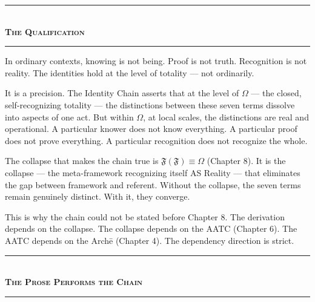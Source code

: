 \documentclass[10pt, openany, oneside]{book}
\renewcommand{\normalsize}{\fontsize{10}{13}\selectfont}
\begin{document}
\vspace{1.5em}


\begin{center}
    \rule{0.3\textwidth}{0.4pt}\\[0.5em]
    {\normalsize\bfseries\scshape The Qualification}\\[0.3em]
    \rule{0.3\textwidth}{0.4pt}
\end{center}

\vspace{1em}

\noindent In ordinary contexts, knowing is not being. Proof is not truth. Recognition is not reality. The identities hold at the level of totality --- not ordinarily.

It is a precision. The Identity Chain asserts that at the level of $\Omega$ --- the closed, self-recognizing totality --- the distinctions between these seven terms dissolve into aspects of one act. But within $\Omega$, at local scales, the distinctions are real and operational. A particular knower does not know everything. A particular proof does not prove everything. A particular recognition does not recognize the whole.

The collapse that makes the chain true is $\mathfrak{F}(\mathfrak{F}) \equiv \Omega$ (Chapter 8). It is the collapse --- the meta-framework recognizing itself AS Reality --- that eliminates the gap between framework and referent. Without the collapse, the seven terms remain genuinely distinct. With it, they converge.

This is why the chain could not be stated before Chapter 8. The derivation depends on the collapse. The collapse depends on the AATC (Chapter 6). The AATC depends on the Arch\={e} (Chapter 4). The dependency direction is strict.

\vspace{1.5em}


\begin{center}
    \rule{0.3\textwidth}{0.4pt}\\[0.5em]
    {\normalsize\bfseries\scshape The Prose Performs the Chain}\\[0.3em]
    \rule{0.3\textwidth}{0.4pt}
\end{center}
\end{document}
